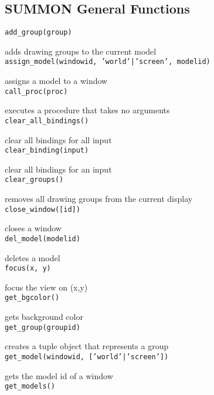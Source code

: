 \subsection{SUMMON General Functions}

{\tt add\_group(group) }

adds drawing groups to the current model \\


{\tt assign\_model(windowid, 'world'|'screen', modelid) }

assigns a model to a window \\


{\tt call\_proc(proc) }

executes a procedure that takes no arguments \\


{\tt clear\_all\_bindings() }

clear all bindings for all input \\


{\tt clear\_binding(input) }

clear all bindings for an input \\


{\tt clear\_groups() }

removes all drawing groups from the current display \\


{\tt close\_window([id]) }

closes a window \\


{\tt del\_model(modelid) }

deletes a model \\


{\tt focus(x, y) }

focus the view on (x,y) \\


{\tt get\_bgcolor() }

gets background color \\


{\tt get\_group(groupid) }

creates a tuple object that represents a group \\


{\tt get\_model(windowid, ['world'|'screen']) }

gets the model id of a window \\


{\tt get\_models() }

